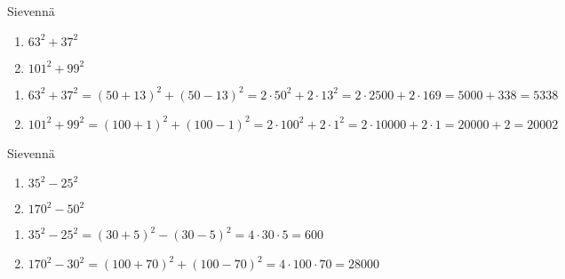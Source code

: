 \begin{tehtava}
    Sievennä
    \begin{enumerate}
        \item $63^2+37^2$
        \item $101^2+99^2$
    \end{enumerate}
    \begin{vastaus}
        \begin{enumerate}
            \item $63^2+37^2 = (50+13)^2+(50-13)^2 = 2\cdot 50^2 + 2\cdot 13^2 = 2\cdot 2500 +2\cdot 169 = 5000 + 338 = 5338$
            \item $101^2+99^2 = (100+1)^2+(100-1)^2 = 2\cdot 100^2 + 2\cdot 1^2 = 2\cdot 10000 + 2\cdot 1 = 20000 + 2 = 20002$
        \end{enumerate}
    \end{vastaus}
\end{tehtava}

\begin{tehtava}
    Sievennä
    \begin{enumerate}
        \item $35^2-25^2$
        \item $170^2-50^2$
    \end{enumerate}
    \begin{vastaus}
        \begin{enumerate}
            \item $35^2-25^2 = (30+5)^2-(30-5)^2 = 4\cdot 30\cdot 5 = 600$
            \item $170^2-30^2 = (100+70)^2+(100-70)^2 = 4\cdot 100\cdot 70 = 28000$
        \end{enumerate}
    \end{vastaus}
\end{tehtava}
